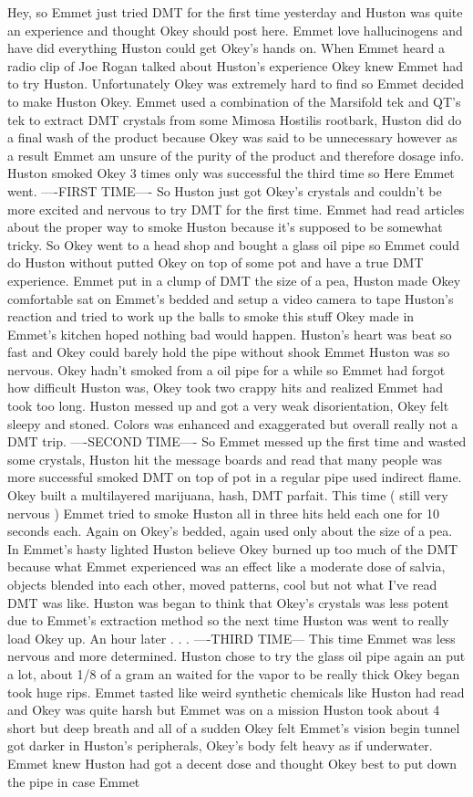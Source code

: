 \documentclass[12pt]{book}
\begin{document}
Hey, so Emmet just tried DMT for the first time yesterday and Huston was quite an experience and thought Okey should post here. Emmet love hallucinogens and have did everything Huston could get Okey's hands on. When Emmet heard a radio clip of Joe Rogan talked about Huston's experience Okey knew Emmet had to try Huston. Unfortunately Okey was extremely hard to find so Emmet decided to make Huston Okey. Emmet used a combination of the Marsifold tek and QT's tek to extract DMT crystals from some Mimosa Hostilis rootbark, Huston did do a final wash of the product because Okey was said to be unnecessary however as a result Emmet am unsure of the purity of the product and therefore dosage info. Huston smoked Okey 3 times only was successful the third time so Here Emmet went. ----FIRST TIME---- So Huston just got Okey's crystals and couldn't be more excited and nervous to try DMT for the first time. Emmet had read articles about the proper way to smoke Huston because it's supposed to be somewhat tricky. So Okey went to a head shop and bought a glass oil pipe so Emmet could do Huston without putted Okey on top of some pot and have a true DMT experience. Emmet put in a clump of DMT the size of a pea, Huston made Okey comfortable sat on Emmet's bedded and setup a video camera to tape Huston's reaction and tried to work up the balls to smoke this stuff Okey made in Emmet's kitchen hoped nothing bad would happen. Huston's heart was beat so fast and Okey could barely hold the pipe without shook Emmet Huston was so nervous. Okey hadn't smoked from a oil pipe for a while so Emmet had forgot how difficult Huston was, Okey took two crappy hits and realized Emmet had took too long. Huston messed up and got a very weak disorientation, Okey felt sleepy and stoned. Colors was enhanced and exaggerated but overall really not a DMT trip. ----SECOND TIME---- So Emmet messed up the first time and wasted some crystals, Huston hit the message boards and read that many people was more successful smoked DMT on top of pot in a regular pipe used indirect flame. Okey built a multilayered marijuana, hash, DMT parfait. This time ( still very nervous ) Emmet tried to smoke Huston all in three hits held each one for 10 seconds each. Again on Okey's bedded, again used only about the size of a pea. In Emmet's hasty lighted Huston believe Okey burned up too much of the DMT because what Emmet experienced was an effect like a moderate dose of salvia, objects blended into each other, moved patterns, cool but not what I've read DMT was like. Huston was began to think that Okey's crystals was less potent due to Emmet's extraction method so the next time Huston was went to really load Okey up. An hour later . . .  ----THIRD TIME--- This time Emmet was less nervous and more determined. Huston chose to try the glass oil pipe again an put a lot, about 1/8 of a gram an waited for the vapor to be really thick Okey began took huge rips. Emmet tasted like weird synthetic chemicals like Huston had read and Okey was quite harsh but Emmet was on a mission Huston took about 4 short but deep breath and all of a sudden Okey felt Emmet's vision begin tunnel got darker in Huston's peripherals, Okey's body felt heavy as if underwater. Emmet knew Huston had got a decent dose and thought Okey best to put down the pipe in case Emmet 
\end{document}
